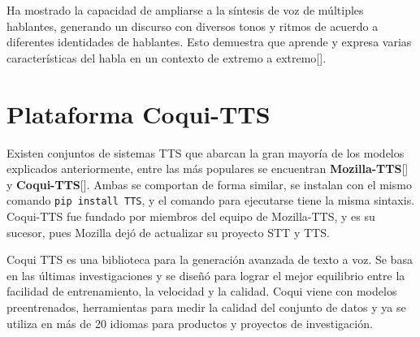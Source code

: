 Ha mostrado la capacidad de ampliarse a la síntesis de voz de múltiples hablantes, generando un discurso con diversos tonos y ritmos de acuerdo a diferentes identidades de hablantes. Esto demuestra que aprende y expresa varias características del habla en un contexto de extremo a extremo[\cite{kim2021conditional}].\\

\section{Plataforma Coqui-TTS}
Existen conjuntos de sistemas TTS que abarcan la gran mayoría de los modelos explicados anteriormente, entre las más populares se encuentran \textbf{Mozilla-TTS}[\cite{mozilla-doc}] y \textbf{Coqui-TTS}[\cite{coqui-doc}]. Ambas se comportan de forma similar, se instalan con el mismo comando \texttt{pip install TTS}, y el comando para ejecutarse tiene la misma sintaxis. Coqui-TTS fue fundado por miembros del equipo de Mozilla-TTS, y es su sucesor, pues Mozilla dejó de actualizar su proyecto STT y TTS.

Coqui TTS es una biblioteca para la generación avanzada de texto a voz. Se basa en las últimas investigaciones y se diseñó para lograr el mejor equilibrio entre la facilidad de entrenamiento, la velocidad y la calidad. Coqui viene con modelos preentrenados, herramientas para medir la calidad del conjunto de datos y ya se utiliza en más de 20 idiomas para productos y proyectos de investigación.


